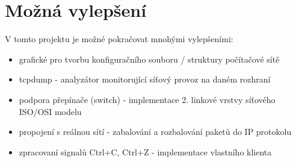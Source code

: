 \chapter{Možná vylepšení}

V tomto projektu je možné pokračovat mnohými vylepšeními:

\begin{itemize}
\item grafické  pro tvorbu konfiguračního souboru / struktury počítačové sítě
\item tcpdump - analyzátor monitorující síťový provoz na daném rozhraní
\item podpora přepínače (switch) - implementace 2. linkové vrstvy síťového ISO/OSI modelu
\item propojení s reálnou sítí - zabalování a rozbalování paketů do IP protokolu
\item zpracovaní signalů Ctrl+C, Ctrl+Z - implementace vlastního klienta
\end{itemize} 

